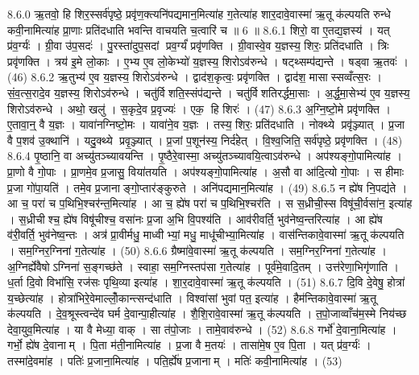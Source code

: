 8.6.0
ऋ॒तवो॒ हि शिर॒स्सर्व॑पृष्ठे॒ प्रवृ॑ण॒क्त्यनि॑पद्यमान॒मित्या॑ह ग॒तेत्या॑ह शार॒दावे॒वास्मा॑ ऋ॒तू क॑ल्पयति रुन्धे कवी॒नामित्या॑ह प्रा॒णाः प्रति॑दधाति भवन्ति वाचयति च॒त्वारि॑ च ॥ 6 ॥
8.6.1
शिरो॒ वा ए॒तद्य॒ज्ञस्य॑ । यत् प्र॑व॒र्ग्यः॑ । ग्री॒वा उ॑प॒सदः॑ । पु॒रस्ता॑दुप॒सदां प्रव॒र्ग्यं॑ प्रवृ॑णक्ति । ग्री॒वास्वे॒व य॒ज्ञस्य॒ शिरः॒ प्रति॑दधाति । त्रिः प्रवृ॑णक्ति । त्रय॑ इ॒मे लो॒काः । ए॒भ्य ए॒व लो॒केभ्यो॑ य॒ज्ञस्य॒ शिरोऽव॑रुन्धे । षट्थ्सम्प॑द्यन्ते । षड्वा ऋ॒तवः॑ । (46)
8.6.2
ऋ॒तुभ्य॑ ए॒व य॒ज्ञस्य॒ शिरोऽव॑रुन्धे । द्वाद॑श॒कृत्वः॒ प्रवृ॑णक्ति । द्वाद॑श॒ मासास्सव्वँत्स॒रः । सं॒व॒त्स॒रादे॒व य॒ज्ञस्य॒ शिरोऽव॑रुन्धे । चतु॑र्विशति॒स्संप॑द्यन्ते । चतु॑र्विशतिरर्द्धमा॒साः । अ॒र्द्ध॒मा॒सेभ्य॑ ए॒व य॒ज्ञस्य॒ शिरोऽव॑रुन्धे । अथो॒ खलु॑ । स॒कृदे॒व प्र॒वृज्यः॑ । एक॒ हि शिरः॑ । (47)
8.6.3
अ॒ग्नि॒ष्टो॒मे प्रवृ॑णक्ति । ए॒तावा॒न्॒ वै य॒ज्ञः । यावा॑नग्निष्टो॒मः । यावा॑ने॒व य॒ज्ञः । तस्य॒ शिरः॒ प्रति॑दधाति । नोक्थ्ये प्रवृ॑ञ्ज्यात् । प्र॒जा वै प॒शव॑ उ॒क्थानि॑ । यदु॒क्थ्ये प्रवृ॒ञ्ज्यात् । प्र॒जां प॒शून॑स्य॒ निर्द॑हेत् । वि॒श्व॒जिति॒ सर्व॑पृष्ठे॒ प्रवृ॑णक्ति । (48)
8.6.4
पृ॒ष्ठानि॒ वा अच्यु॑तञ्च्यावयन्ति । पृ॒ष्ठैरे॒वास्मा॒ अच्यु॑तञ्च्यावयि॒त्वाऽव॑रुन्धे । अप॑श्यङ्गो॒पामित्या॑ह । प्रा॒णो वै गो॒पाः । प्रा॒णमे॒व प्र॒जासु॒ विया॑तयति । अप॑श्यङ्गो॒पामित्या॑ह । अ॒सौ वा आ॑दि॒त्यो गो॒पाः । स हीमाः प्र॒जा गो॑पा॒यति॑ । तमे॒व प्र॒जानाङ्गो॒प्तार॑ङ्कुरुते । अनि॑पद्यमान॒मित्या॑ह । (49)
8.6.5
न ह्ये॑ष नि॒पद्य॑ते । आ च॒ परा॑ च प॒थिभि॒श्चर॑न्त॒मित्या॑ह । आ च॒ ह्ये॑ष परा॑ च प॒थिभि॒श्चर॑ति । स स॒ध्रीची॒स्स विषू॑ची॒र्वसा॑न॒ इत्या॑ह । स॒ध्रीचीश्च॒ ह्ये॑ष विषू॑चीश्च॒ वसा॑नः प्र॒जा अ॒भि वि॒पश्य॑ति । आव॑रीवर्ति॒ भुव॑नेष्व॒न्तरित्या॑ह । आ ह्ये॑ष व॑री॒वर्ति॒ भुव॑नेष्व॒न्तः । अत्र॑ प्रा॒वीर्मधु॒ माध्वीभ्यां॒ मधु॒ माधू॑चीभ्या॒मित्या॑ह । वास॑न्तिकावे॒वास्मा॑ ऋ॒तू क॑ल्पयति । सम॒ग्निर॒ग्निना॑ ग॒तेत्या॑ह । (50)
8.6.6
ग्रैष्मा॑वे॒वास्मा॑ ऋ॒तू क॑ल्पयति । सम॒ग्निर॒ग्निना॑ ग॒तेत्या॑ह । अ॒ग्निर्ह्ये॑वैषोऽग्निना॑ स॒ङ्गच्छ॑ते । स्वाहा॒ सम॒ग्निस्तप॑सा ग॒तेत्या॑ह । पूर्व॑मे॒वादि॒तम् । उत्त॑रेणा॒भिगृ॑णाति । ध॒र्ता दि॒वो विभा॑सि॒ रज॑सः पृथि॒व्या इत्या॑ह । शा॒र॒दावे॒वास्मा॑ ऋ॒तू क॑ल्पयति । (51)
8.6.7
दि॒वि दे॒वेषु॒ होत्रा॑ य॒च्छेत्या॑ह । होत्रा॑भिरे॒वेमाल्लोँ॒कान्त्सन्द॑धाति । विश्वा॑सां भुवां पत॒ इत्या॑ह । हैम॑न्तिकावे॒वास्मा॑ ऋ॒तू क॑ल्पयति । दे॒व॒श्रूस्त्वन्दे॑व घर्म दे॒वान्पा॒हीत्या॑ह । शै॒शि॒रावे॒वास्मा॑ ऋ॒तू क॑ल्पयति । त॒पो॒जाव्वाँच॑म॒स्मे निय॑च्छ देवा॒युव॒मित्या॑ह । या वै मेध्या॒ वाक् । सा त॑पो॒जाः । तामे॒वाव॑रुन्धे । (52)
8.6.8
गर्भो॑ दे॒वाना॒मित्या॑ह । गर्भो॒ ह्ये॑ष दे॒वानाम् । पि॒ता म॑ती॒नामित्या॑ह । प्र॒जा वै म॒तयः॑ । तासा॑मे॒ष ए॒व पि॒ता । यत् प्र॑व॒र्ग्यः॑ । तस्मा॑दे॒वमा॑ह । पतिः॑ प्र॒जाना॒मित्या॑ह । पति॒र्ह्ये॑ष प्र॒जानाम् । मतिः॑ कवी॒नामित्या॑ह । (53)
